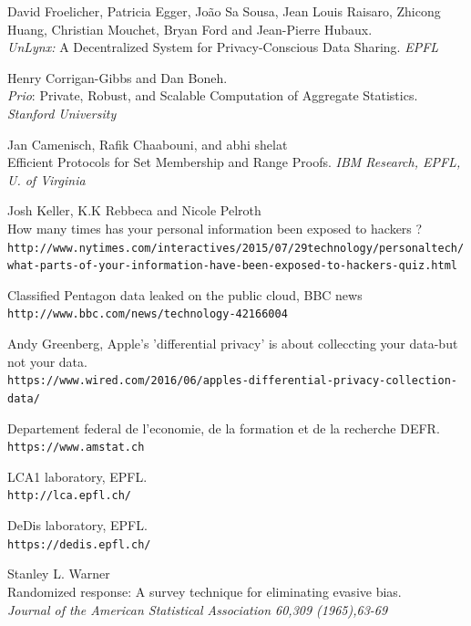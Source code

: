 \documentclass{article}
\begin{document}
\newpage
\begin{thebibliography}{9}

David Froelicher, Patricia Egger, João Sa Sousa, Jean Louis Raisaro, Zhicong Huang, Christian Mouchet, Bryan Ford and Jean-Pierre Hubaux.\\
\textit{UnLynx:} A Decentralized System for Privacy-Conscious Data Sharing. 
\textit{EPFL}
 
Henry Corrigan-Gibbs and Dan Boneh.\\
\textit{Prio}: Private, Robust, and Scalable Computation of Aggregate Statistics.
\textit{Stanford University}


Jan Camenisch, Rafik Chaabouni, and abhi shelat\\
Efficient Protocols for Set Membership and Range Proofs.
\textit{IBM Research, EPFL, U. of Virginia}

Josh Keller, K.K Rebbeca and Nicole Pelroth\\
How many times has your personal information been exposed to hackers ?
\\\texttt{http://www.nytimes.com/interactives/2015/07/29technology/personaltech/what-parts-of-your-information-have-been-exposed-to-hackers-quiz.html}

Classified Pentagon data leaked on the public cloud, BBC news
\\\texttt{http://www.bbc.com/news/technology-42166004}

Andy Greenberg, Apple's 'differential privacy' is about colleccting your data-but not your data.
\\\texttt{https://www.wired.com/2016/06/apples-differential-privacy-collection-data/}

Departement federal de l'economie, de la formation et de la recherche DEFR.
\\\texttt{https://www.amstat.ch}

LCA1 laboratory, EPFL.
\\\texttt{http://lca.epfl.ch/}

DeDis laboratory, EPFL.
\\\texttt{https://dedis.epfl.ch/}

Stanley L. Warner\\
Randomized response: A survey technique for eliminating evasive bias.\\
\textit{Journal of the American Statistical Association 60,309 (1965),63-69}


\end{thebibliography}
\end{document}
